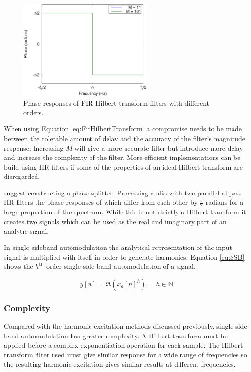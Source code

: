 		\begin{figure}[h!]
			\centering
			\includegraphics[width=0.6\textwidth]{chapter3/Images/HilbertPhaseResponses.eps}
			\caption{Phase responses of FIR Hilbert transform filters with different orders.}
			\label{fig:HilbertPhase}
		\end{figure}

		When using Equation \ref{eq:FirHilbertTransform} a compromise needs to be made between the tolerable amount
		of delay and the accuracy of the filter's magnitude response. Increasing $M$ will give a more accurate
		filter but introduce more delay and increase the complexity of the filter. More efficient implementations
		can be build using IIR filters if some of the properties of an ideal Hilbert transform are disregarded.

		\citet{oppenheim2014discrete} suggest constructing a phase splitter. Processing audio with two parallel
		allpass IIR filters the phase responses of which differ from each other by $\frac{\pi}{2}$ radians for a
		large proportion of the spectrum. While this is not strictly a Hilbert transform it creates two signals
		which can be used as the real and imaginary part of an analytic signal. 

		In single sideband automodulation the analytical representation of the input signal is multiplied with
		itself in order to generate harmonics. Equation \ref{eq:SSB} shows the $h^{\text{th}}$ order single side
		band automodulation of a signal.

		\begin{equation}
			y[n] = \Re \left( x_{a}[n]^{h} \right), \quad h \in \mathbb{N}
			\label{eq:SSB}
		\end{equation}

		\subsubsection*{Complexity}
			Compared with the harmonic excitation methods discussed previously, single side band automodulation
			has greater complexity. A Hilbert transform must be applied before a complex exponentiation
			operation for each sample. The Hilbert transform filter used must give similar response for a wide
			range of frequencies so the resulting harmonic excitation gives similar results at different
			frequencies.
			
